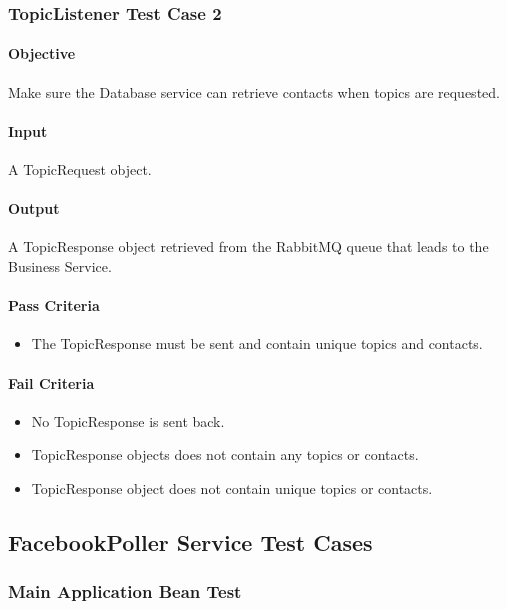 \documentclass[hidelinks,english]{article}
\begin{document}
			\subsubsection{TopicListener Test Case 2}\label{databasetopiclistenertest2}
				\paragraph{Objective} Make sure the Database service can retrieve contacts when topics are requested.
				\paragraph{Input} A TopicRequest object.
				\paragraph{Output} A TopicResponse object retrieved from the RabbitMQ queue that leads to the Business Service.
				\paragraph{Pass Criteria}
				\begin{itemize}
					\item The TopicResponse must be sent and contain unique topics and contacts.
				\end{itemize}
				\paragraph{Fail Criteria}
				\begin{itemize}
					\item No TopicResponse is sent back.
					\item TopicResponse objects does not contain any topics or contacts.
					\item TopicResponse object does not contain unique topics or contacts.
				\end{itemize}
				
		\subsection{FacebookPoller Service Test Cases}
			\subsubsection{Main Application Bean Test}\label{facebookapplicationbeanstest}
\end{document}
